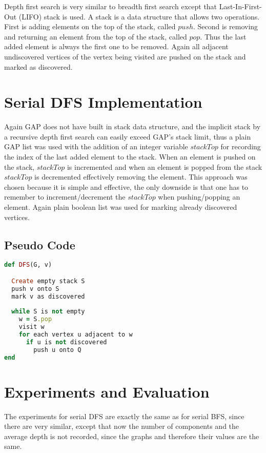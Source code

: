 \documentclass{report}
\theoremstyle{plain}
\theoremstyle{definition}
\theoremstyle{remark}
\begin{document}
Depth first search is very similar to breadth first search except that Last-In-First-Out (LIFO) stack is used. A stack is a data structure that allows two operations. First is adding elements on the top of the stack, called $push$. Second is removing and returning an element from the top of the stack, called $pop$. Thus the last added element is always the first one to be removed. Again all adjacent undiscovered vertices of the vertex being visited are pushed on the stack and marked as discovered.

\section{Serial DFS Implementation}

Again GAP does not have built in stack data structure, and the implicit stack by a recursive depth first search can easily exceed GAP's stack limit, thus a plain GAP list was used with the addition of an integer variable $stackTop$ for recording the index of the last added element to the stack. When an element is pushed on the stack, $stackTop$ is incremented and when an element is popped from the stack $stackTop$ is decremented effectively removing the element. This approach was chosen because it is simple and effective, the only downside is that one has to remember to increment/decrement the $stackTop$ when pushing/popping an element. Again plain boolean list was used for marking already discovered vertices.

\subsection*{Pseudo Code}

\begin{lstlisting}[language=Ruby]
def DFS(G, v)

  Create empty stack S
  push v onto S
  mark v as discovered
  
  while S is not empty
    w = S.pop
    visit w
    for each vertex u adjacent to w
      if u is not discovered
        push u onto Q
end
\end{lstlisting}

\section{Experiments and Evaluation}

The experiments for serial DFS are exactly the same as for serial BFS, since there are very similar, except that now the number of components and the average depth is not recorded, since the graphs and therefore their values are the same.
\end{document}
